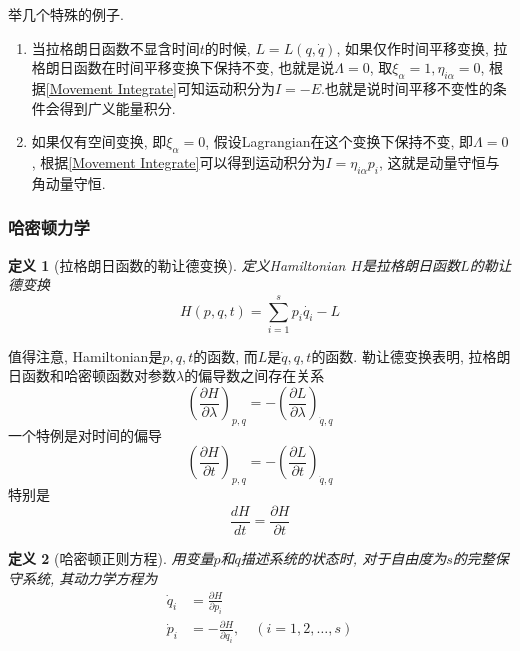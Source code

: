 \documentclass[a4paper,11pt]{article}
\newtheorem{definition}{\hspace{2em}定义}[section]
\begin{document}
举几个特殊的例子.
\begin{enumerate}
  \item 当拉格朗日函数不显含时间$t$的时候, $L=L(q,\dot{q})$, 如果仅作时间平移变换, 拉格朗日函数在时间平移变换下保持不变, 也就是说$\Lambda=0$, 取$\xi_\alpha=1,\eta_{i\alpha}=0$, 根据\eqref{Movement Integrate}可知运动积分为$I=-E$.也就是说时间平移不变性的条件会得到广义能量积分.
  \item 如果仅有空间变换, 即$\xi_\alpha=0$, 假设Lagrangian在这个变换下保持不变, 即$\Lambda=0$, 根据\eqref{Movement Integrate}可以得到运动积分为$I=\eta_{i\alpha}p_i$, 这就是动量守恒与角动量守恒.
\end{enumerate}
\subsubsection{哈密顿力学}
\begin{definition}[拉格朗日函数的勒让德变换]
  定义Hamiltonian $H$是拉格朗日函数$L$的勒让德变换
  \begin{equation}\label{Legendra trans}
    H(p,q,t)=\sum_{i=1}^{s}p_i\dot{q_i}-L
  \end{equation}
\end{definition}
值得注意, Hamiltonian是$p,q,t$的函数, 而$L$是$\dot{q},q,t$的函数. 勒让德变换表明, 拉格朗日函数和哈密顿函数对参数$\lambda$的偏导数之间存在关系
\begin{equation}\label{H,Lambda}
  \left(\frac{\partial H}{\partial \lambda}\right)_{p,q}=-\left(\frac{\partial L}{\partial \lambda}\right)_{\dot{q},q}
\end{equation}
一个特例是对时间的偏导
\begin{equation}\label{H,L}
  \left(\frac{\partial H}{\partial t}\right)_{p,q}=-\left(\frac{\partial L}{\partial t}\right)_{\dot{q},q}
\end{equation}
特别是
\begin{equation}\label{H,t}
  \frac{dH}{dt}=\frac{\partial H}{\partial t}
\end{equation}
\begin{definition}[哈密顿正则方程]
  用变量$p$和$q$描述系统的状态时, 对于自由度为$s$的完整保守系统, 其动力学方程为
  \begin{equation}\label{Hamilton equ}
  \begin{split}
     \dot{q}_i&=\frac{\partial H}{\partial{p_i}} \\
     \dot{p}_i&=-\frac{\partial H}{\partial{q_i}},\quad(i=1,2,\dots,s)
  \end{split}
  \end{equation}
\end{definition}
\end{document}
